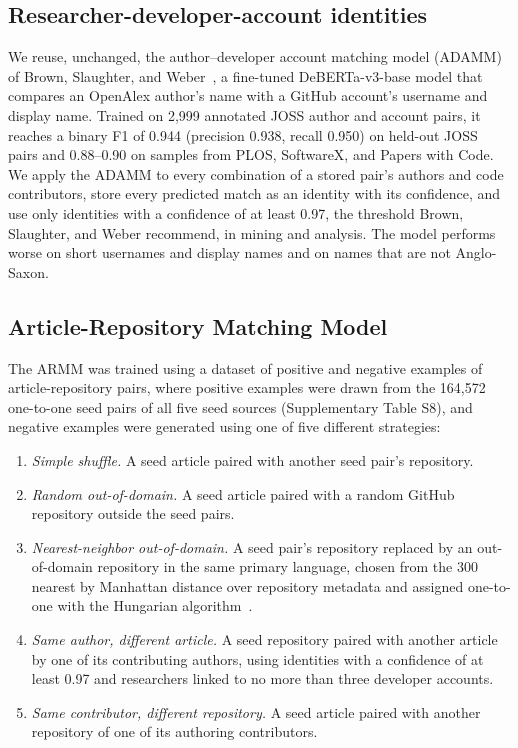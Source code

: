 \documentclass[pdflatex,sn-nature]{sn-jnl}%
\begin{document}
\subsection{Researcher-developer-account identities}\label{subsec:m-identities}

We reuse, unchanged, the author--developer account matching model (ADAMM) of Brown, Slaughter, and Weber~\cite{brown2026code}, a fine-tuned DeBERTa-v3-base model that compares an OpenAlex author's name with a GitHub account's username and display name.
Trained on 2,999 annotated JOSS author and account pairs, it reaches a binary F1 of 0.944 (precision 0.938, recall 0.950) on held-out JOSS pairs and 0.88--0.90 on samples from PLOS, SoftwareX, and Papers with Code.
We apply the ADAMM to every combination of a stored pair's authors and code contributors, store every predicted match as an identity with its confidence, and use only identities with a confidence of at least 0.97, the threshold Brown, Slaughter, and Weber recommend, in mining and analysis.
The model performs worse on short usernames and display names and on names that are not Anglo-Saxon.

\subsection{Article-Repository Matching Model}\label{subsec:m-armm}

The ARMM was trained using a dataset of positive and negative examples of article-repository pairs, where positive examples were drawn from the 164,572 one-to-one seed pairs of all five seed sources (Supplementary Table S8), and negative examples were generated using one of five different strategies:

\begin{enumerate}
\item \emph{Simple shuffle.} A seed article paired with another seed pair's repository.
\item \emph{Random out-of-domain.} A seed article paired with a random GitHub repository outside the seed pairs.
\item \emph{Nearest-neighbor out-of-domain.} A seed pair's repository replaced by an out-of-domain repository in the same primary language, chosen from the 300 nearest by Manhattan distance over repository metadata and assigned one-to-one with the Hungarian algorithm~\cite{crouse2016implementing}.
\item \emph{Same author, different article.} A seed repository paired with another article by one of its contributing authors, using identities with a confidence of at least 0.97 and researchers linked to no more than three developer accounts.
\item \emph{Same contributor, different repository.} A seed article paired with another repository of one of its authoring contributors.
\end{enumerate}
\end{document}
